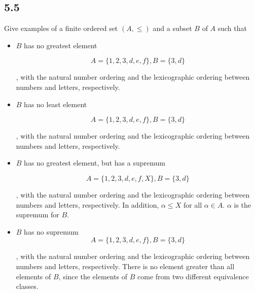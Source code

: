 \subsection*{5.5} Give examples of a finite ordered set $(A, \leq)$ and a subset $B$ of $A$ such that

\begin{itemize}
    \item $B$ has no greatest element
    
    $$ A= \{1,2,3,d,e,f\}, B=\{3,d\}$$
    
    , with the natural number ordering and the lexicographic ordering between numbers and letters, respectively. 
    
    \item $B$ has no least element
    
    $$ A= \{1,2,3,d,e,f\}, B=\{3,d\}$$
    
    , with the natural number ordering and the lexicographic ordering between numbers and letters, respectively. 
    
    \item $B$ has no greatest element, but has a supremum
    
    $$ A= \{1,2,3,d,e,f,X\}, B=\{3,d\}$$
    
    , with the natural number ordering and the lexicographic ordering between numbers and letters, respectively. In addition, $\alpha \leq X$ for all $\alpha \in A$. $\alpha$ is the supremum for $B$.
    
    \item $B$ has no supremum
    $$ A= \{1,2,3,d,e,f\}, B=\{3,d\}$$
    
    , with the natural number ordering and the lexicographic ordering between numbers and letters, respectively. There is no element greater than all elements of $B$, since the elements of $B$ come from two different equivalence classes.
\end{itemize}



